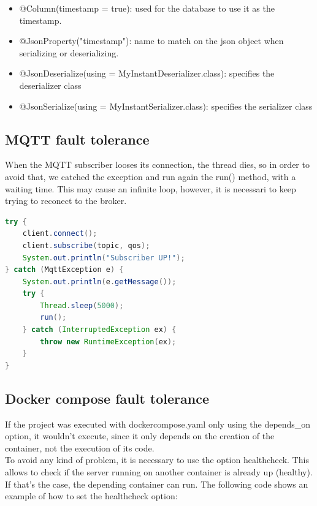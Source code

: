 \documentclass[12pt, letterpaper]{article}
\begin{document}
\begin{itemize}
  \item @Column(timestamp = true): used for the database to use it as the timestamp.
  \item @JsonProperty("timestamp"): name to match on the json object when serializing or deserializing.
  \item @JsonDeserialize(using = MyInstantDeserializer.class): specifies the deserializer class
  \item @JsonSerialize(using = MyInstantSerializer.class): specifies the serializer class
\end{itemize}

\subsection{MQTT fault tolerance}
When the MQTT subscriber looses its connection, the thread dies, so in order to avoid that, we catched the exception and run again the run() method, with a waiting time. This may cause an infinite loop, however, it is necessari to keep trying to reconect to the broker. \\

\begin{lstlisting}[language=java]
try {
    client.connect();
    client.subscribe(topic, qos);
    System.out.println("Subscriber UP!");
} catch (MqttException e) {
    System.out.println(e.getMessage());
    try {
        Thread.sleep(5000);
        run();
    } catch (InterruptedException ex) {
        throw new RuntimeException(ex);
    }
}

\end{lstlisting}

\subsection{Docker compose fault tolerance}
If the project was executed with docker\textendash compose.yaml only using the depends\_on option, it wouldn't execute, since it only depends on the creation of the container, not the execution of its code. \\ 

To avoid any kind of problem, it is necessary to use the option healthcheck. This allows to check if the server running on another container is already up (healthy). If that's the case, the depending container can run. The following code shows an example of how to set the healthcheck option: \\
\end{document}
